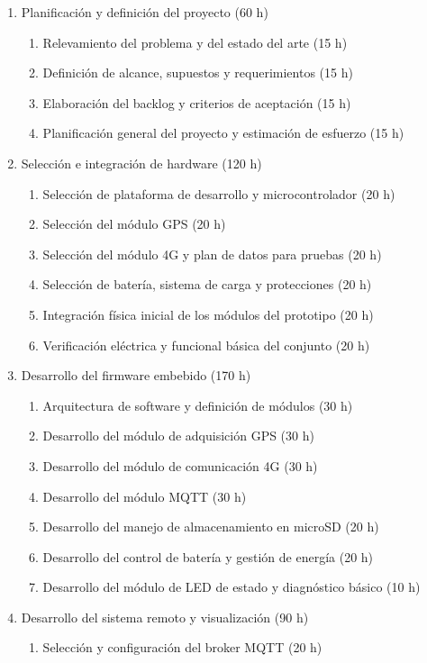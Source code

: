 \documentclass[
11pt, %
]{charter}
\begin{document}
\begin{enumerate}
\item Planificación y definición del proyecto (60 h)
	\begin{enumerate}
	\item Relevamiento del problema y del estado del arte (15 h)
	\item Definición de alcance, supuestos y requerimientos (15 h)
	\item Elaboración del backlog y criterios de aceptación (15 h)
	\item Planificación general del proyecto y estimación de esfuerzo (15 h)
	\end{enumerate}
\item Selección e integración de hardware (120 h)
	\begin{enumerate}
	\item Selección de plataforma de desarrollo y microcontrolador (20 h)
	\item Selección del módulo GPS (20 h)
	\item Selección del módulo 4G y plan de datos para pruebas (20 h)
	\item Selección de batería, sistema de carga y protecciones (20 h)
	\item Integración física inicial de los módulos del prototipo (20 h)
	\item Verificación eléctrica y funcional básica del conjunto (20 h)
	\end{enumerate}
\item Desarrollo del firmware embebido (170 h)
	\begin{enumerate}
	\item Arquitectura de software y definición de módulos (30 h)
	\item Desarrollo del módulo de adquisición GPS (30 h)
	\item Desarrollo del módulo de comunicación 4G (30 h)
	\item Desarrollo del módulo MQTT (30 h)
	\item Desarrollo del manejo de almacenamiento en microSD (20 h)
	\item Desarrollo del control de batería y gestión de energía (20 h)
	\item Desarrollo del módulo de LED de estado y diagnóstico básico (10 h)
	\end{enumerate}
\item Desarrollo del sistema remoto y visualización (90 h)
	\begin{enumerate}
	\item Selección y configuración del broker MQTT (20 h)

\end{enumerate}
\end{enumerate}
\end{document}
